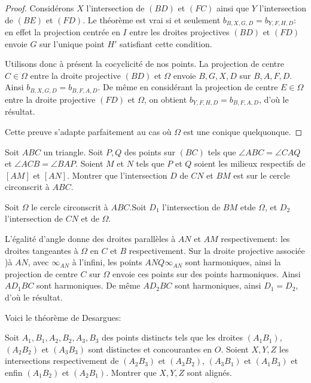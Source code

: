 \begin{proof}
Considérons $X$ l'intersection de $(BD)$ et $(FC)$ ainsi que $Y$ l'intersection de $(BE)$ et $(FD)$. Le théorème est vrai si et seulement $b_{B,X,G,D}=b_{Y,F,H,D}$: en effet la projection centrée en $I$ entre les droites projectives $(BD)$ et $(FD)$ envoie $G$ sur l'unique point $H'$ satisfiant cette condition.

\medskip

Utilisons donc à présent la cocyclicité de nos points. La projection de centre $C\in \Omega$ entre la droite projective $(BD)$ et $\Omega$ envoie $B,G,X,D$ sur $B,A,F,D$. Ainsi $b_{B,X,G,D}=b_{B,F,A,D}$. De même en considérant la projection de centre $E\in \Omega$ entre la droite projective $(FD)$ et $\Omega$, on obtient $b_{Y,F,H,D}=b_{B,F,A,D}$, d'où le résultat.

\medskip

Cette preuve s'adapte parfaitement au cas où $\Omega$ est une conique quelquonque.
\end{proof}

\begin{exo}
Soit $ABC$ un triangle. Soit $P,Q$ des points sur $(BC)$ tels que $\angle ABC=\angle  CAQ$ et $\angle ACB=\angle BAP$. Soient $M$ et $N$ tels que $P$ et $Q$ soient les milieux respectifs de $[AM]$ et $[AN]$. Montrer que l'intersection $D$ de $CN$ et $BM$ est sur le cercle circonscrit à $ABC$.
\end{exo}

\begin{sol}
Soit $\Omega$ le cercle circonscrit à $ABC$.Soit $D_1$ l'intersection de $BM$ etde $\Omega$, et $D_2$ l'intersection de $CN$ et de $\Omega$. 

\medskip

L'égalité d'angle donne des droites parallèles à $AN$ et $AM$ respectivement: les droites tangeantes à $\Omega$ en $C$ et $B$ respectivement. Sur la droite projective associée )à $AN$, avec $\infty_{AN}$ à l'infini, les points $ANQ\infty_{AN}$ sont harmoniques, ainsi la projection de centre $C$ sur $\Omega$ envoie ces points sur des points harmoniques. Ainsi $AD_1BC$ sont harmoniques. De même $AD_2BC$ sont harmoniques, ainsi $D_1=D_2$, d'où le résultat. 
\end{sol}

Voici le théorème de Desargues:

\begin{thm}
Soit $A_1,B_1,A_2,B_2,A_3,B_3$ des points distincts tels que les droites  $(A_1B_1)$,$(A_2B_2)$ et $(A_3B_3)$ sont distinctes et concourantes en $O$. Soient $X,Y,Z$ les intersections respectivement de $(A_2B_3)$ et $(A_3B_2)$, $(A_3B_1)$ et $(A_1B_3)$ et enfin $(A_1B_2)$ et $(A_2B_1)$. Montrer que $X,Y,Z$ sont alignés.
\end{thm}

